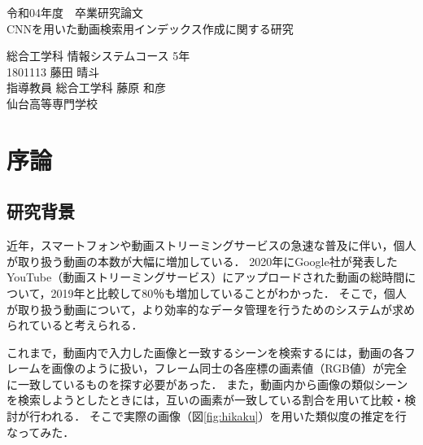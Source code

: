 \documentclass[a4j,12pt,dvipdfmx]{jreport}
\begin{document}
\begin{titlepage} \centering
  \null \null
  \vspace{10mm}
  令和04年度　卒業研究論文\\
  \vspace{55.15mm}
  \null
  {\Large CNNを用いた動画検索用インデックス作成に関する研究}\\
  
  \vspace{87.5mm}
  
  \large
  総合工学科 情報システムコース 5年\\[1mm]
  1801113 藤田 晴斗\\[1mm]
  指導教員 総合工学科 藤原 和彦\\
  
  \vspace{16mm}
  {仙台高等専門学校}
  \null

\end{titlepage}

\clearpage {\clearpage}
\large
\renewcommand{\baselinestretch}{1.1}

\chapter{序論}
\label{sec:introducion}

\section{研究背景}
近年，スマートフォンや動画ストリーミングサービスの急速な普及に伴い，個人が取り扱う動画の本数が大幅に増加している．
2020年にGoogle社が発表したYouTube（動画ストリーミングサービス）にアップロードされた動画の総時間について，2019年と比較して80％も増加していることがわかった\cite{google_data}．
そこで，個人が取り扱う動画について，より効率的なデータ管理を行うためのシステムが求められていると考えられる．

これまで，動画内で入力した画像と一致するシーンを検索するには，動画の各フレームを画像のように扱い，フレーム同士の各座標の画素値（RGB値）が完全に一致しているものを探す必要があった．
また，動画内から画像の類似シーンを検索しようとしたときには，互いの画素が一致している割合を用いて比較・検討が行われる．
そこで実際の画像（図\ref{fig:hikaku}）を用いた類似度の推定を行なってみた．
\end{document}
